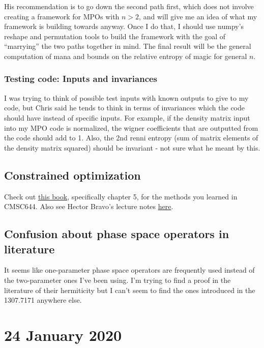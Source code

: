\documentclass{report}
\begin{document}
 His recommendation is to go down the second path first, which does not involve creating a framework for MPOs with $n>2$, and will give me an idea of what my framework is building towards anyway. Once I do that, I should use numpy's reshape and permutation tools to build the framework with the goal of ``marrying'' the two paths together in mind. The final result will be the general computation of mana and bounds on the relative entropy of magic for general $n$.
 
\subsection{Testing code: Inputs and invariances}

I was trying to think of possible test inputs with known outputs to give to my code, but Chris said he tends to think in terms of invariances which the code should have instead of specific inputs. For example, if the density matrix input into my MPO code is normalized, the wigner coefficients that are outputted from the code should add to 1. Also, the 2nd renni entropy (sum of matrix elements of the density matrix squared) should be invariant - not sure what he meant by this. 
 
 \section{Constrained optimization}
 
 Check out \href{https://web.stanford.edu/~boyd/cvxbook/bv_cvxbook.pdf}{this book}, specifically chapter 5, for the methods you learned in CMSC644.  Also see Hector Bravo's lecture notes \href{http://www.hcbravo.org/dscert-algo/lectures/cmsc644-gibbs_sampling.pdf}{here}.

\section{Confusion about phase space operators in literature}

It seems like one-parameter phase space operators are frequently used instead of the two-parameter ones I've been using. I'm trying to find a proof in the literature of their hermiticity but I can't seem to find the ones introduced in the 1307.7171 anywhere else. 

\chapter{24 January 2020}
\end{document}
